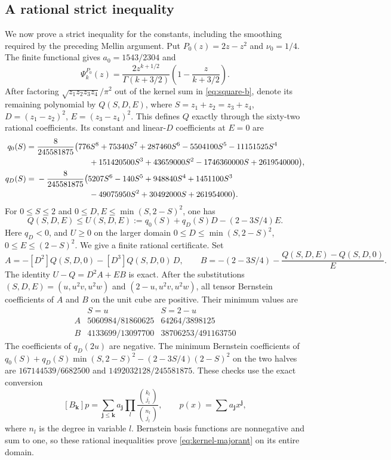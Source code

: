 \subsection{A rational strict inequality}
We now prove a strict inequality for the constants, including the
smoothing required by the preceding Mellin argument. Put
$P_0(z)=2z-z^2$ and $\nu_0=1/4$. The finite functional gives
$a_0=1543/2304$ and
\[
 \Psi_k^{P_0}(z)=\frac{2z^{k+1/2}}{\Gamma(k+3/2)}
                         \left(1-\frac z{k+3/2}\right).
\]
After factoring $\sqrt{z_1z_2z_3z_4}/\pi^2$ out of the kernel
sum in \eqref{eq:square-b}, denote its remaining polynomial by
$Q(S,D,E)$, where
$S=z_1+z_2=z_3+z_4$, $D=(z_1-z_2)^2$, $E=(z_3-z_4)^2$.
This defines $Q$ exactly through the sixty-two rational coefficients.
Its constant and linear-$D$ coefficients at $E=0$ are
\begin{align*}
 q_0(S)={}&\frac8{245581875}\bigl(776S^8+75340S^7+287460S^6
 -5504100S^5-11151525S^4\\
 &\hspace{23mm}+151420500S^3+43659000S^2
 -1746360000S+2619540000\bigr),\\
 q_D(S)={}&-\frac8{245581875}\bigl(5207S^6-140S^5+948840S^4
 +1451100S^3\\
 &\hspace{23mm}-49075950S^2+30492000S+261954000\bigr).
\end{align*}
For $0\le S\le2$ and $0\le D,E\le\min(S,2-S)^2$, one has
\begin{equation}\label{eq:kernel-majorant}
 Q(S,D,E)\le U(S,D,E):=q_0(S)+q_D(S)D-(2-3S/4)E.
\end{equation}
Here $q_D<0$, and $U\ge0$ on the larger domain
$0\le D\le\min(S,2-S)^2$, $0\le E\le(2-S)^2$.
We give a finite rational certificate. Set
\[
 A=-[D^2]Q(S,D,0)-[D^3]Q(S,D,0)\,D,\qquad
 B=-(2-3S/4)-\frac{Q(S,D,E)-Q(S,D,0)}E.
\]
The identity $U-Q=D^2A+EB$ is exact. After the substitutions
$(S,D,E)=(u,u^2v,u^2w)$ and $(2-u,u^2v,u^2w)$, all tensor
Bernstein coefficients of $A$ and $B$ on the unit cube are positive.
Their minimum values are
\[
 \begin{array}{c|cc}
 &S=u&S=2-u\\\hline
 A&5060984/81860625&64264/3898125\\
 B&4133699/13097700&38706253/491163750
 \end{array}
\]
The coefficients of $q_D(2u)$ are negative. The minimum Bernstein
coefficients of
$q_0(S)+q_D(S)\min(S,2-S)^2-(2-3S/4)(2-S)^2$
on the two halves are $167144539/6682500$ and
$1492032128/245581875$. These checks use the exact conversion
\[
 [B_{\mathbf k}]p=\sum_{\mathbf j\le\mathbf k}a_{\mathbf j}
       \prod_l\frac{\binom{k_l}{j_l}}{\binom{n_l}{j_l}},
 \qquad p(x)=\sum a_{\mathbf j}x^{\mathbf j},
\]
where $n_l$ is the degree in variable $l$. Bernstein basis functions
are nonnegative and sum to one, so these rational inequalities prove
\eqref{eq:kernel-majorant} on its entire domain.

